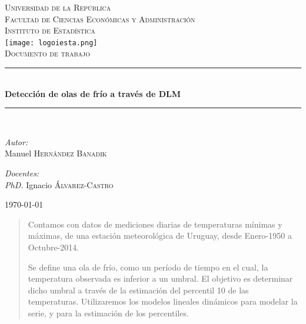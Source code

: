 \documentclass{article}
\newcommand{\HRule}{\rule{\linewidth}{0.5mm}}
\begin{document}
\begin{titlepage}
\begin{center}



\vspace*{\fill}
\textsc{\LARGE Universidad de la República}\\[1.5cm]

\textsc{\Large Facultad de Ciencias Económicas y Administración}\\[1.5cm]

\textsc{\large Instituto de Estadística}\\[1.5cm]

\texttt{[image: logoiesta.png]}~\\[1cm]

\textsc{\large Documento de trabajo}\\[0.5cm]


\HRule \\[0.4cm]
{\Large \bfseries Detección de olas de frío a través de DLM }

\HRule \\[1.5cm]

\begin{minipage}{0.4\textwidth}
\begin{flushleft}
\emph{Autor:}\\
Manuel \textsc{Hernández Banadik}
\\
\end{flushleft}
\end{minipage}
\begin{minipage}{0.4\textwidth}
\begin{flushright}
\emph{Docentes:} \\
\textit{PhD.} Ignacio \textsc{Álvarez-Castro}
\end{flushright}
\end{minipage}

\vfill

{\large \today}

\end{center}
\end{titlepage}\pagebreak


\tableofcontents
\listoffigures
\listoftables

\pagebreak

\begin{abstract}

Contamos con datos de mediciones diarias de temperaturas mínimas y máximas, de una estación meteorológica de Uruguay, desde Enero-1950 a Octubre-2014.

Se define una ola de frío, como un período de tiempo en el cual, la temperatura observada es inferior a un umbral. El objetivo es determinar dicho umbral a través de la estimación del percentil 10 de las temperaturas. Utilizaremos los modelos lineales dinámicos para modelar la serie, y para la estimación de los percentiles.

\end{abstract}
\end{document}
